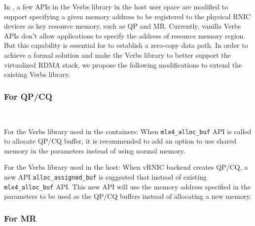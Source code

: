 In \sys, a few APIs in the Verbs library in the host user space are modified to support specifying a given memory address to be registered to the physical RNIC devices as key resource memory, such as QP and MR. Currently, vanilla Verbs APIs don't allow applications to specify the address of resource memory region. But this capability is essential for \sys to establish a zero-copy data path.
In order to achieve a formal solution and make the Verbs library to better support the virtualized RDMA stack, we propose the following modifications to extend the existing Verbs library.


\subsubsection{\textbf{For QP/CQ}}
\
\noindent

For the Verbs library used in the containers: When \texttt{mlx4\_alloc\_buf} API is called to allocate QP/CQ buffer, it is recommended to add an option to use shared memory in the parameters instead of using normal memory.

For the Verbs library used in the host: When vRNIC backend creates QP/CQ, a new API \texttt{alloc\_assigned\_buf} is suggested that instead of existing \texttt{mlx4\_alloc\_buf} API. This new API will use the memory address specified in the parameters to be used as the QP/CQ buffers instead of allocating a new memory.


\subsubsection{\textbf{For MR}}
\
\noindent

